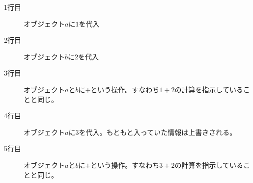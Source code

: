 \begin{description}
	\item[1行目] オブジェクト$a$に$1$を代入
	\item[2行目] オブジェクト$b$に$2$を代入
	\item[3行目] オブジェクト$a$と$b$に$+$という操作。すなわち$1+2$の計算を指示していることと同じ。
	\item[4行目] オブジェクト$a$に$3$を代入。もともと入っていた情報は上書きされる。
	\item[5行目] オブジェクト$a$と$b$に$+$という操作。すなわち$3+2$の計算を指示していることと同じ。
\end{description}
